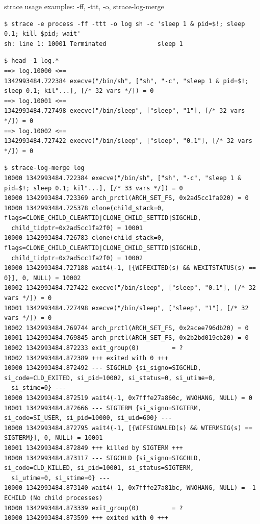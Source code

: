 \documentclass[unicode,aspectratio=169]{beamer}
\begin{document}
\begin{frame}[fragile]{strace usage examples: -ff, -ttt, -o, strace-log-merge}
\Tiny
\begin{verbatim}
$ strace -e process -ff -ttt -o log sh -c 'sleep 1 & pid=$!; sleep 0.1; kill $pid; wait'
sh: line 1: 10001 Terminated              sleep 1
\end{verbatim}

\begin{verbatim}
$ head -1 log.*
==> log.10000 <==
1342993484.722384 execve("/bin/sh", ["sh", "-c", "sleep 1 & pid=$!; sleep 0.1; kil"...], [/* 32 vars */]) = 0
==> log.10001 <==
1342993484.727498 execve("/bin/sleep", ["sleep", "1"], [/* 32 vars */]) = 0
==> log.10002 <==
1342993484.727422 execve("/bin/sleep", ["sleep", "0.1"], [/* 32 vars */]) = 0
\end{verbatim}

\begin{verbatim}
$ strace-log-merge log
10000 1342993484.722384 execve("/bin/sh", ["sh", "-c", "sleep 1 & pid=$!; sleep 0.1; kil"...], [/* 33 vars */]) = 0
10000 1342993484.723369 arch_prctl(ARCH_SET_FS, 0x2ad5cc1fa020) = 0
10000 1342993484.725378 clone(child_stack=0, flags=CLONE_CHILD_CLEARTID|CLONE_CHILD_SETTID|SIGCHLD,
  child_tidptr=0x2ad5cc1fa2f0) = 10001
10000 1342993484.726783 clone(child_stack=0, flags=CLONE_CHILD_CLEARTID|CLONE_CHILD_SETTID|SIGCHLD,
  child_tidptr=0x2ad5cc1fa2f0) = 10002
10000 1342993484.727188 wait4(-1, [{WIFEXITED(s) && WEXITSTATUS(s) == 0}], 0, NULL) = 10002
10002 1342993484.727422 execve("/bin/sleep", ["sleep", "0.1"], [/* 32 vars */]) = 0
10001 1342993484.727498 execve("/bin/sleep", ["sleep", "1"], [/* 32 vars */]) = 0
10002 1342993484.769744 arch_prctl(ARCH_SET_FS, 0x2acee796db20) = 0
10001 1342993484.769845 arch_prctl(ARCH_SET_FS, 0x2b2bd019cb20) = 0
10002 1342993484.872233 exit_group(0)         = ?
10002 1342993484.872389 +++ exited with 0 +++
10000 1342993484.872492 --- SIGCHLD {si_signo=SIGCHLD, si_code=CLD_EXITED, si_pid=10002, si_status=0, si_utime=0,
  si_stime=0} ---
10000 1342993484.872519 wait4(-1, 0x7fffe27a860c, WNOHANG, NULL) = 0
10001 1342993484.872666 --- SIGTERM {si_signo=SIGTERM, si_code=SI_USER, si_pid=10000, si_uid=600} ---
10000 1342993484.872795 wait4(-1, [{WIFSIGNALED(s) && WTERMSIG(s) == SIGTERM}], 0, NULL) = 10001
10001 1342993484.872849 +++ killed by SIGTERM +++
10000 1342993484.873117 --- SIGCHLD {si_signo=SIGCHLD, si_code=CLD_KILLED, si_pid=10001, si_status=SIGTERM,
  si_utime=0, si_stime=0} ---
10000 1342993484.873140 wait4(-1, 0x7fffe27a81bc, WNOHANG, NULL) = -1 ECHILD (No child processes)
10000 1342993484.873339 exit_group(0)         = ?
10000 1342993484.873599 +++ exited with 0 +++
\end{verbatim}
\end{frame}
\end{document}
